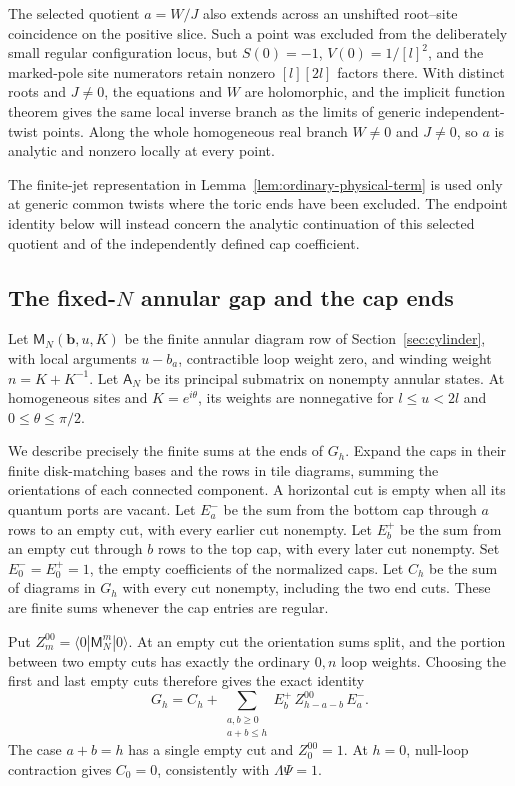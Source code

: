 The selected quotient \(a=W/J\) also extends across an unshifted root--site coincidence on the positive slice. Such a point was excluded from the deliberately small regular configuration locus, but \(S(0)=-1\), \(V(0)=1/[l]^2\), and the marked-pole site numerators retain nonzero \([l][2l]\) factors there. With distinct roots and \(J\ne0\), the equations and \(W\) are holomorphic, and the implicit function theorem gives the same local inverse branch as the limits of generic independent-twist points. Along the whole homogeneous real branch \(W\ne0\) and \(J\ne0\), so \(a\) is analytic and nonzero locally at every point.

The finite-jet representation in Lemma~\ref{lem:ordinary-physical-term} is used only at generic common twists where the toric ends have been excluded. The endpoint identity below will instead concern the analytic continuation of this selected quotient and of the independently defined cap coefficient.

\subsection{The fixed-\(N\) annular gap and the cap ends}

Let \(\mathsf M_N(\mathbf b,u,K)\) be the finite annular diagram row of Section~\ref{sec:cylinder}, with local arguments \(u-b_a\), contractible loop weight zero, and winding weight \(n=K+K^{-1}\). Let \(\mathsf A_N\) be its principal submatrix on nonempty annular states. At homogeneous sites and \(K=e^{i\theta}\), its weights are nonnegative for \(l\le u<2l\) and \(0\le\theta\le\pi/2\).

We describe precisely the finite sums at the ends of \(G_h\). Expand the caps in their finite disk-matching bases and the rows in tile diagrams, summing the orientations of each connected component. A horizontal cut is empty when all its quantum ports are vacant. Let \(E^-_a\) be the sum from the bottom cap through \(a\) rows to an empty cut, with every earlier cut nonempty. Let \(E^+_b\) be the sum from an empty cut through \(b\) rows to the top cap, with every later cut nonempty. Set \(E^-_0=E^+_0=1\), the empty coefficients of the normalized caps. Let \(C_h\) be the sum of diagrams in \(G_h\) with every cut nonempty, including the two end cuts. These are finite sums whenever the cap entries are regular.

Put \(Z_m^{00}=\langle0|\mathsf M_N^m|0\rangle\). At an empty cut the orientation sums split, and the portion between two empty cuts has exactly the ordinary \(0,n\) loop weights. Choosing the first and last empty cuts therefore gives the exact identity
\begin{equation}\label{eq:cap-end-decomposition}
 G_h=C_h+\sum_{\substack{a,b\ge0\\a+b\le h}}
 E^+_b\,Z_{h-a-b}^{00}\,E^-_a .
\end{equation}
The case \(a+b=h\) has a single empty cut and \(Z_0^{00}=1\). At \(h=0\), null-loop contraction gives \(C_0=0\), consistently with \(\Lambda\Psi=1\).

